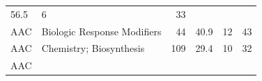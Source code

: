 \documentclass[11pt,]{article}
\begin{document}
\begin{longtable}[]{@{}llrrrr@{}}
\begin{minipage}[t]{0.08\columnwidth}
56.5\strut
\end{minipage} & \begin{minipage}[t]{0.11\columnwidth}\raggedleft\strut
6\strut
\end{minipage} & \begin{minipage}[t]{0.11\columnwidth}\raggedleft\strut
33\strut
\end{minipage}\tabularnewline
\begin{minipage}[t]{0.06\columnwidth}\raggedright\strut
AAC\strut
\end{minipage} & \begin{minipage}[t]{0.43\columnwidth}\raggedright\strut
Biologic Response Modifiers\strut
\end{minipage} & \begin{minipage}[t]{0.04\columnwidth}\raggedleft\strut
44\strut
\end{minipage} & \begin{minipage}[t]{0.08\columnwidth}\raggedleft\strut
40.9\strut
\end{minipage} & \begin{minipage}[t]{0.11\columnwidth}\raggedleft\strut
12\strut
\end{minipage} & \begin{minipage}[t]{0.11\columnwidth}\raggedleft\strut
43\strut
\end{minipage}\tabularnewline
\begin{minipage}[t]{0.06\columnwidth}\raggedright\strut
AAC\strut
\end{minipage} & \begin{minipage}[t]{0.43\columnwidth}\raggedright\strut
Chemistry; Biosynthesis\strut
\end{minipage} & \begin{minipage}[t]{0.04\columnwidth}\raggedleft\strut
109\strut
\end{minipage} & \begin{minipage}[t]{0.08\columnwidth}\raggedleft\strut
29.4\strut
\end{minipage} & \begin{minipage}[t]{0.11\columnwidth}\raggedleft\strut
10\strut
\end{minipage} & \begin{minipage}[t]{0.11\columnwidth}\raggedleft\strut
32\strut
\end{minipage}\tabularnewline
\begin{minipage}[t]{0.06\columnwidth}\raggedright\strut
AAC\strut
\end{minipage} & \begin{minipage}[t]{0.43\columnwidth}\raggedright\strut

\end{minipage}
\end{longtable}
\end{document}

